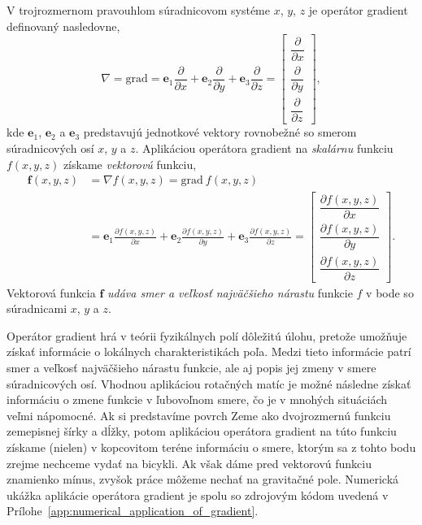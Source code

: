 \documentclass[a4paper, 12pt]{book}
\newcommand{\grad}{\mathrm{grad}}
\let\vec\mathbf
\begin{document}
V trojrozmernom pravouhlom súradnicovom systéme $x$, $y$, $z$ je operátor 
gradient definovaný nasledovne,
%
\begin{equation}
\label{eq:gradient}
\nabla = \grad = \vec e_1 \frac{\partial}{\partial x} + \vec e_2 
\frac{\partial}{\partial y} + \vec e_3 \frac{\partial}{\partial z} =
\begin{bmatrix}
\dfrac{\partial}{\partial x} \\[2ex]
\dfrac{\partial}{\partial y} \\[2ex]
\dfrac{\partial}{\partial z}
\end{bmatrix}
{,}
\end{equation}
%
kde $\vec e_1$, $\vec e_2$ a $\vec e_3$ predstavujú jednotkové vektory 
rovnobežné so smerom súradnicových osí $x$, $y$ a $z$.  Aplikáciou operátora 
gradient na \emph{skalárnu} funkciu $f(x, y, z)$ získame \emph{vektorovú} 
funkciu,
%
\begin{equation}
\begin{split}
\vec f(x, y, z) &= \nabla f(x, y, z) = \grad \ f(x, y, z)\\
%
&= \vec e_1 \frac{\partial f(x, y, z)}{\partial x} + \vec e_2 \frac{\partial 
f(x, y, z)}{\partial y} + \vec e_3 \frac{\partial f(x, y, z)}{\partial z} =
\begin{bmatrix}
\dfrac{\partial f(x, y, z)}{\partial x} \\[2ex]
\dfrac{\partial f(x, y, z)}{\partial y} \\[2ex]
\dfrac{\partial f(x, y, z)}{\partial z}
\end{bmatrix}
{.}
\end{split}
\end{equation}
%
Vektorová funkcia $\vec f$ \emph{udáva smer a veľkosť najväčšieho nárastu} 
funkcie $f$ v bode so súradnicami $x$, $y$ a $z$.

Operátor gradient hrá v teórii fyzikálnych polí dôležitú úlohu, pretože 
umožňuje získať informácie o lokálnych charakteristikách poľa.  Medzi tieto 
informácie patrí smer a veľkosť najväčšieho nárastu funkcie, ale aj popis jej 
zmeny v smere súradnicových osí.  Vhodnou aplikáciou rotačných matíc je možné 
následne získať informáciu o zmene funkcie v ľubovoľnom smere, čo je v mnohých 
situáciách veľmi nápomocné.  Ak si predstavíme povrch Zeme ako dvojrozmernú 
funkciu zemepisnej šírky a dĺžky, potom aplikáciou operátora gradient na túto 
funkciu získame (nielen) v kopcovitom teréne informáciu o smere, ktorým sa 
z tohto bodu zrejme nechceme vydať na bicykli.  Ak však dáme pred vektorovú 
funkciu znamienko mínus, zvyšok práce môžeme nechať na gravitačné pole.  
Numerická ukážka aplikácie operátora gradient je spolu so zdrojovým kódom 
uvedená v Prílohe~\ref{app:numerical_application_of_gradient}.
\end{document}
